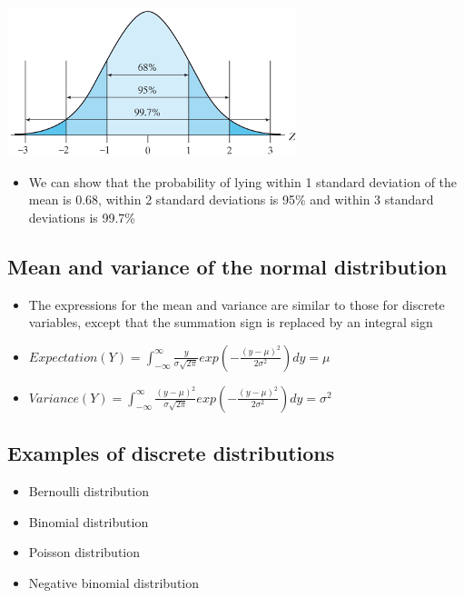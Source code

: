 \documentclass[
]{book}
\providecommand{\tightlist}{%
  \setlength{\itemsep}{0pt}\setlength{\parskip}{0pt}}
\begin{document}
\includegraphics[width=0.5\linewidth]{./2_57}

\begin{itemize}
\tightlist
\item
  We can show that the probability of lying within 1 standard deviation of the mean is 0.68, within 2 standard deviations is 95\% and within 3 standard deviations is 99.7\%
\end{itemize}

\hypertarget{mean-and-variance-of-the-normal-distribution}{%
\subsection{Mean and variance of the normal distribution}\label{mean-and-variance-of-the-normal-distribution}}

\begin{itemize}
\tightlist
\item
  The expressions for the mean and variance are similar to those for discrete variables, except that the summation sign is replaced by an integral sign
\item
  \(Expectation(Y)=\int_{-\infty}^\infty\frac{y}{\sigma\sqrt{2\pi}}exp\left(-\frac{(y-\mu)^2}{2\sigma^2}\right)dy = \mu\)
\item
  \(Variance(Y)=\int_{-\infty}^\infty\frac{(y-\mu)^2}{\sigma\sqrt{2\pi}}exp\left(-\frac{(y-\mu)^2}{2\sigma^2}\right)dy = \sigma^2\)
\end{itemize}

\hypertarget{examples-of-discrete-distributions}{%
\subsection{Examples of discrete distributions}\label{examples-of-discrete-distributions}}

\begin{itemize}
\tightlist
\item
  Bernoulli distribution
\item
  Binomial distribution
\item
  Poisson distribution
\item
  Negative binomial distribution
\end{itemize}
\end{document}
